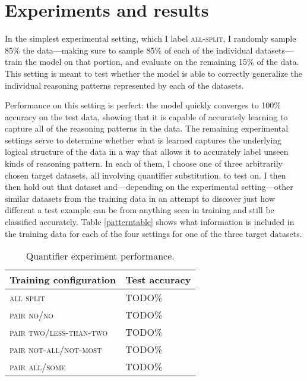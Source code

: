 
\section{Experiments and results}


In the simplest experimental setting, which I label \textsc{all-split}, I randomly sample 85\% the data---making sure to sample 85\% of each of the individual datasets---train the model on that portion, and evaluate on the remaining 15\% of the data. This setting is meant to test whether the model is able to correctly generalize the individual reasoning patterns represented by each of the datasets. 

Performance on this setting is perfect: the model quickly converges to 100\% accuracy on the test data, showing that it is capable of accurately learning to capture all of the reasoning patterns in the data. The remaining experimental settings serve to determine whether what is learned captures the underlying logical structure of the data in a way that allows it to accurately label unseen kinds of reasoning pattern. In each of them, I choose one of three arbitrarily chosen target datasets, all involving quantifier substitution, to test on. I then then hold out that dataset and---depending on the experimental setting---other similar datasets from the training data in an attempt to discover just how different a test example can be from anything seen in training and still be classified accurately. Table \ref{patterntable} shows what information is included in the training data for each of the four settings for one of the three target datasets. 

\begin{table}\small\centering
\begin{tabular}{|l|l|}\hline
\textbf{Training configuration} & \textbf{Test accuracy}\\\hline
\textsc{all split}	&	TODO\% \\\hline
\textsc{pair no/no}	&	TODO\% \\
\textsc{pair two/less-than-two}	&	TODO\% \\
\textsc{pair not-all/not-most}	&	TODO\% \\
\textsc{pair all/some}	&	TODO\% \\\hline
\end{tabular}

\caption{Quantifier experiment performance.\label{resultstable}}
\end{table} %

